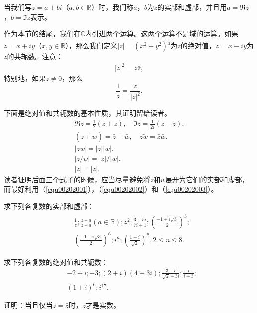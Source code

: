 当我们写$z = a + bi$（$a, b \in \mathbb{R}$）时，我们称$a$，$b$为$z$的实部和虚部，并且用$a = \Re{z}$，$b=\Im{z}$表示。

作为本节的结尾，我们在$\mathbb{C}$内引进两个运算。这两个运算不是域的运算。如果$z = x+iy$（$x, y \in \mathbb{R}$），那么我们定义$|z| = (x^2+y^2)^{\frac{1}{2}}$为$z$的绝对值，$\bar{z}=x-iy$为$z$的共轭数。注意：
\begin{gather}\label{equ00202001}
|z|^2=z\bar{z},
\end{gather}
特别地，如果$z \neq 0$，那么
\[
\frac{1}{z} = \frac{\bar{z}}{|z|^2}.
\]

下面是绝对值和共轭数的基本性质，其证明留给读者。
\begin{gather}
\Re{z} = \frac{1}{2}(z + \bar{z}), \quad \Im{z} = \frac{1}{2i}(z - \bar{z}). \label{equ00202002} \\
(\bar{z+w}) = \bar{z} + \bar{w}, \quad \bar{zw} = \bar{z}\bar{w}. \label{equ00202003}\\
|zw| = |z||w|. \label{equ00202004} \\
|z/w| = |z|/|w|.\label{equ00202005}\\
|\bar{z}| = |z|.\label{equ00202006}
\end{gather}
读者证明后面三个式子的时候，应当尽量避免将$z$和$w$展开为它们的实部和虚部，而最好利用（\ref{equ00202001}），（\ref{equ00202002}）和（\ref{equ00202003}）。

\begin{exercise}
求下列各复数的实部和虚部：
\begin{gather*}
\begin{aligned}
&\frac{1}{z}; \frac{z-a}{z+a}(a \in \mathbb{R}); z^2; \frac{3+5i}{7i+1}; (\frac{-1+i\sqrt{3}}{2})^3;\\
&(\frac{-1-i\sqrt{3}}{2})^6; i^n; (\frac{1+i}{\sqrt{2}})^n, 2 \le n \le 8.
\end{aligned}
\end{gather*}
\end{exercise}

\begin{exercise}
求下列各复数的绝对值和共轭数：
\[
\begin{aligned}
&-2+i; -3; (2+i)(4+3i);\frac{3-i}{\sqrt{2}+3i};\frac{i}{i+3}; \\
&(1+i)^6; i^{17}.
\end{aligned}
\]
\end{exercise}

\begin{exercise}
证明：当且仅当$z=\bar{z}$时，$z$才是实数。
\end{exercise}

